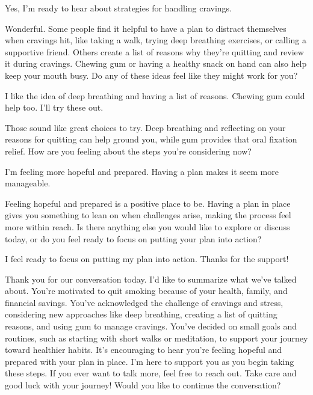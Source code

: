 \begin{clientbox}
Yes, I'm ready to hear about strategies for handling cravings.
\end{clientbox}

\begin{counsellorbox}
Wonderful. Some people find it helpful to have a plan to distract themselves when cravings hit, like taking a walk, trying deep breathing exercises, or calling a supportive friend. Others create a list of reasons why they're quitting and review it during cravings. Chewing gum or having a healthy snack on hand can also help keep your mouth busy. Do any of these ideas feel like they might work for you?
\end{counsellorbox}

\begin{clientbox}
I like the idea of deep breathing and having a list of reasons. Chewing gum could help too. I'll try these out.
\end{clientbox}

\begin{counsellorbox}
Those sound like great choices to try. Deep breathing and reflecting on your reasons for quitting can help ground you, while gum provides that oral fixation relief. How are you feeling about the steps you're considering now?
\end{counsellorbox}

\begin{clientbox}
I'm feeling more hopeful and prepared. Having a plan makes it seem more manageable.
\end{clientbox}

\begin{counsellorbox}
Feeling hopeful and prepared is a positive place to be. Having a plan in place gives you something to lean on when challenges arise, making the process feel more within reach. Is there anything else you would like to explore or discuss today, or do you feel ready to focus on putting your plan into action?
\end{counsellorbox}

\begin{clientbox}
I feel ready to focus on putting my plan into action. Thanks for the support!
\end{clientbox}

\begin{counsellorbox}
Thank you for our conversation today. I'd like to summarize what we've talked about. You're motivated to quit smoking because of your health, family, and financial savings. You've acknowledged the challenge of cravings and stress, considering new approaches like deep breathing, creating a list of quitting reasons, and using gum to manage cravings. You've decided on small goals and routines, such as starting with short walks or meditation, to support your journey toward healthier habits. It's encouraging to hear you're feeling hopeful and prepared with your plan in place. I'm here to support you as you begin taking these steps. If you ever want to talk more, feel free to reach out. Take care and good luck with your journey! Would you like to continue the conversation?
\end{counsellorbox}

